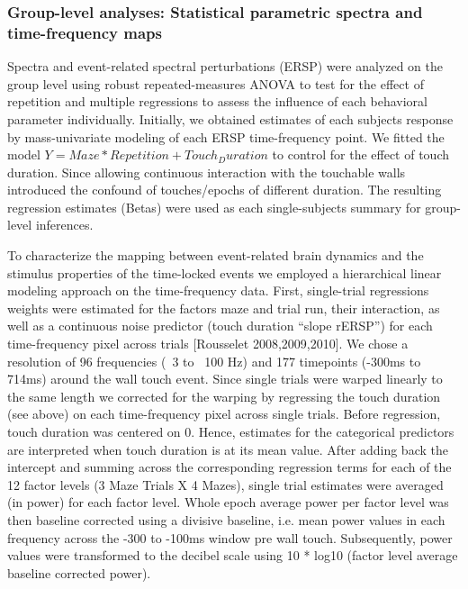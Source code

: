 \subsubsection{Group-level analyses: Statistical parametric spectra and time-frequency maps}
Spectra and event-related spectral perturbations (ERSP\citep{Makeig2004}) were analyzed on the group level using robust repeated-measures ANOVA\citep{Pernet2011} to test for the effect of repetition and multiple regressions to assess the influence of each behavioral parameter individually. Initially, we obtained estimates of each subjects response by mass-univariate modeling of each ERSP time-frequency point. We fitted the model $Y = Maze*Repetition + Touch_Duration$ to control for the effect of touch duration. Since allowing continuous interaction with the touchable walls introduced the confound of touches/epochs of different duration. The resulting regression estimates (Betas) were used as each single-subjects summary for group-level inferences.

To characterize the mapping between event-related brain dynamics and the stimulus properties of the time-locked events we employed a hierarchical linear modeling approach on the time-frequency data. First, single-trial regressions weights were estimated for the factors maze and trial run, their interaction, as well as a continuous noise predictor (touch duration “slope rERSP”) for each time-frequency pixel across trials [Rousselet 2008,2009,2010]. We chose a resolution of 96 frequencies  (~3 to ~100 Hz) and 177 timepoints (-300ms to 714ms) around the wall touch event. Since single trials were warped linearly to the same length we corrected for the warping by regressing the touch duration (see above) on each time-frequency pixel across single trials. Before regression, touch duration was centered on 0. Hence, estimates for the categorical predictors are interpreted when touch duration is at its mean value. After adding back the intercept and summing across the corresponding regression terms for each of the 12 factor levels (3 Maze Trials X 4 Mazes), single trial estimates were averaged (in power) for each factor level. Whole epoch average power per factor level was then baseline corrected using a divisive baseline, i.e. mean power values in each frequency across the -300 to -100ms window pre wall touch. Subsequently, power values were transformed to the decibel scale using 10 * log10 (factor level average baseline corrected power).

